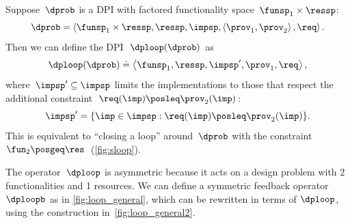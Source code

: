 \begin{definition}[$\dploop$]
\label{def:dp_loop}Suppose~$\dprob$ is a DPI with factored functionality
space~$\funsp_{1}\times\ressp$:
\[
\dprob=\left\langle \funsp_{1}\times\ressp,\ressp,\impsp,\left\langle \prov_{1},\prov_{2}\right\rangle ,\req\right\rangle .
\]
Then we can define the DPI~$\dploop(\dprob)$ as
\[
\dploop(\dprob)\doteq\left\langle \funsp_{1},\ressp,\impsp',\prov_{1},\req\right\rangle ,
\]
where~$\impsp'\subseteq\impsp$ limits the implementations to those
that respect the additional constraint~$\req(\imp)\posleq\prov_{2}(\imp)$:
\[
\impsp'=\{\imp\in\impsp:\req(\imp)\posleq\prov_{2}(\imp)\}.
\]
This is equivalent to ``closing a loop'' around~$\dprob$ with
the constraint~$\fun_{2}\posgeq\res$~(\cref{fig:sloop}).
\end{definition}


The operator~$\dploop$ is asymmetric because it acts on a design
problem with 2 functionalities and 1 resources. We can define a symmetric
feedback operator $\dploopb$ as in \cref{fig:loop_general}, which
can be rewritten in terms of $\dploop$, using the construction in~\cref{fig:loop_general2}\emph{.}

